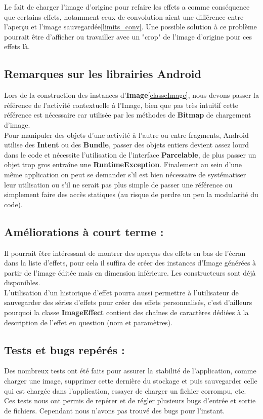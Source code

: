 Le fait de charger l'image d'origine pour refaire les effets a comme conséquence que certains effets, notamment ceux de convolution aient une différence entre l'aperçu et l'image sauvegardée\ref{limits_conv}. Une possible solution à ce problème pourrait être d'afficher ou travailler avec un "crop" de l'image d'origine pour ces effets là.
\\

\subsection{Remarques sur les librairies Android}
Lors de la construction des instances d'\textbf{Image}\ref{classeImage}, nous devons passer la référence de l'activité contextuelle à l'Image, bien que pas très intuitif cette référence est nécessaire car utilisée par les méthodes de \textbf{Bitmap} de chargement d'image.
\\

\label{parcelable}
Pour manipuler des objets d'une activité à l'autre ou entre fragments, Android utilise des \textbf{Intent} ou des \textbf{Bundle}, passer des objets entiers devient assez lourd dans le code et nécessite l'utilisation de l'interface \textbf{Parcelable}, de plus passer un objet trop gros entraîne une \textbf{RuntimeException}. Finalement au sein d'une même application on peut se demander s'il est bien nécessaire de systématiser leur utilisation ou s'il ne serait pas plus simple de passer une référence ou simplement faire des accès statiques (au risque de perdre un peu la modularité du code).

\subsection{Améliorations à court terme :}
Il pourrait être intéressant de montrer des aperçus des effets en bas de l'écran dans la liste d'effets, pour cela il suffira de créer des instances d'Image générées à partir de l'image éditée mais en dimension inférieure. Les constructeurs sont déjà disponibles.
\\

L'utilisation d'un historique d'effet pourra aussi permettre à l'utilisateur de sauvegarder des séries d'effets pour créer des effets personnalisés, c'est d'ailleurs pourquoi la classe \textbf{ImageEffect} contient des chaînes de caractères dédiées à la description de l'effet en question (nom et paramètres).

\subsection{Tests et bugs repérés :}
Des nombreux tests ont été faits pour assurer la stabilité de l'application, comme charger une image, supprimer cette dernière du stockage et puis sauvegarder celle qui est chargée dans l'application, essayer de charger un fichier corrompu, etc. Ces tests nous ont permis de repérer et de régler plusieurs bugs d'entrée et sortie de fichiers. Cependant nous n'avons pas trouvé des bugs pour l'instant.

